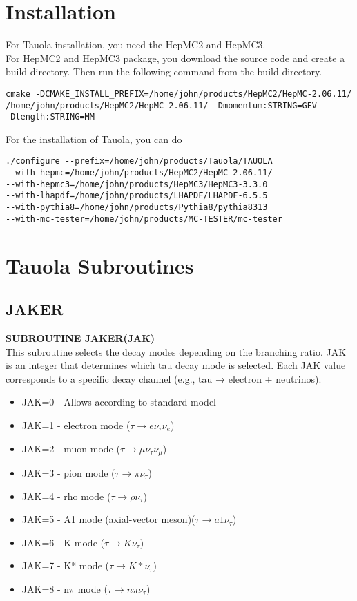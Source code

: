 \documentclass[12pt]{article}
\begin{document}
\maketitlepage

\section{Installation}

For Tauola installation, you need the HepMC2 and HepMC3.\\

For HepMC2 and HepMC3 package, you download the source code and create a build directory. Then run the following command from the build directory.

\begin{verbatim}
cmake -DCMAKE_INSTALL_PREFIX=/home/john/products/HepMC2/HepMC-2.06.11/
/home/john/products/HepMC2/HepMC-2.06.11/ -Dmomentum:STRING=GEV
-Dlength:STRING=MM
\end{verbatim}

For the installation of Tauola, you can do
\begin{verbatim}
./configure --prefix=/home/john/products/Tauola/TAUOLA
--with-hepmc=/home/john/products/HepMC2/HepMC-2.06.11/
--with-hepmc3=/home/john/products/HepMC3/HepMC3-3.3.0
--with-lhapdf=/home/john/products/LHAPDF/LHAPDF-6.5.5
--with-pythia8=/home/john/products/Pythia8/pythia8313
--with-mc-tester=/home/john/products/MC-TESTER/mc-tester
\end{verbatim}


\section{Tauola Subroutines}
\subsection{JAKER}
\textbf{SUBROUTINE JAKER(JAK)}\\
This subroutine selects the decay modes depending on the branching ratio. JAK is an integer that determines which tau decay mode is selected. Each JAK value corresponds to a specific decay channel (e.g., tau → electron + neutrinos).

\begin{itemize}
    \item JAK=0 - Allows according to standard model
    \item JAK=1 - electron mode ($\tau \rightarrow  e \nu_\tau \nu_e$)
    \item JAK=2 - muon mode ($\tau \rightarrow  \mu \nu_\tau \nu_\mu$)
    \item JAK=3 - pion mode ($\tau \rightarrow  \pi \nu_\tau$)
    \item JAK=4 - rho mode ($\tau \rightarrow  \rho \nu_\tau$)
    \item JAK=5 - A1 mode (axial-vector meson)($\tau \rightarrow  a1 \nu_\tau$)
    \item JAK=6 - K mode ($\tau \rightarrow  K \nu_\tau$)
    \item JAK=7 - K* mode ($\tau \rightarrow  K* \nu_\tau$)
    \item JAK=8 - n$\pi$ mode ($\tau \rightarrow  n\pi \nu_\tau$)
\end{itemize}
\end{document}
